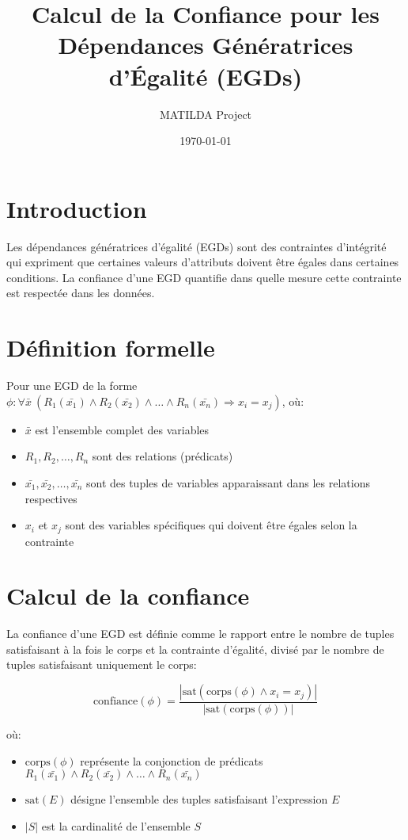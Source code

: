 \documentclass{article}
\title{Calcul de la Confiance pour les Dépendances Génératrices d'Égalité (EGDs)}
\author{MATILDA Project}
\date{\today}
\begin{document}
\maketitle

\section{Introduction}

Les dépendances génératrices d'égalité (EGDs) sont des contraintes d'intégrité qui expriment que certaines valeurs d'attributs doivent être égales dans certaines conditions. La confiance d'une EGD quantifie dans quelle mesure cette contrainte est respectée dans les données.

\section{Définition formelle}

Pour une EGD de la forme $\phi : \forall \bar{x} \ (R_1(\bar{x_1}) \wedge R_2(\bar{x_2}) \wedge \ldots \wedge R_n(\bar{x_n}) \Rightarrow x_i = x_j)$, où:
\begin{itemize}
    \item $\bar{x}$ est l'ensemble complet des variables
    \item $R_1, R_2, \ldots, R_n$ sont des relations (prédicats)
    \item $\bar{x_1}, \bar{x_2}, \ldots, \bar{x_n}$ sont des tuples de variables apparaissant dans les relations respectives
    \item $x_i$ et $x_j$ sont des variables spécifiques qui doivent être égales selon la contrainte
\end{itemize}

\section{Calcul de la confiance}

La confiance d'une EGD est définie comme le rapport entre le nombre de tuples satisfaisant à la fois le corps et la contrainte d'égalité, divisé par le nombre de tuples satisfaisant uniquement le corps:

\begin{equation}
\text{confiance}(\phi) = \frac{|\text{sat}(\text{corps}(\phi) \wedge x_i = x_j)|}{|\text{sat}(\text{corps}(\phi))|}
\end{equation}

où:
\begin{itemize}
    \item $\text{corps}(\phi)$ représente la conjonction de prédicats $R_1(\bar{x_1}) \wedge R_2(\bar{x_2}) \wedge \ldots \wedge R_n(\bar{x_n})$
    \item $\text{sat}(E)$ désigne l'ensemble des tuples satisfaisant l'expression $E$
    \item $|S|$ est la cardinalité de l'ensemble $S$
\end{itemize}
\end{document}
